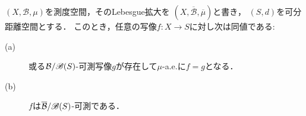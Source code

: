 		\begin{screen}
			\begin{thm}[拡大前後の可測性]\label{thm:measurability_before_after_Lebesgue_extension}
				$(X,\mathcal{B},\mu)$を測度空間，そのLebesgue拡大を
				$\left(X,\overline{\mathcal{B}},\overline{\mu}\right)$と書き，
				$(S,d)$を可分距離空間とする．
				このとき，任意の写像$f:X \longrightarrow S$に対し次は同値である:
				\begin{description}
					\item[(a)] 或る$\mathcal{B}/\mathscr{B}(S)$-可測写像$g$が存在して$\mu$-a.e.に$f = g$となる．
					\item[(b)] $f$は$\overline{\mathcal{B}}/\mathscr{B}(S)$-可測である．
				\end{description}
			\end{thm}
		\end{screen}
		

